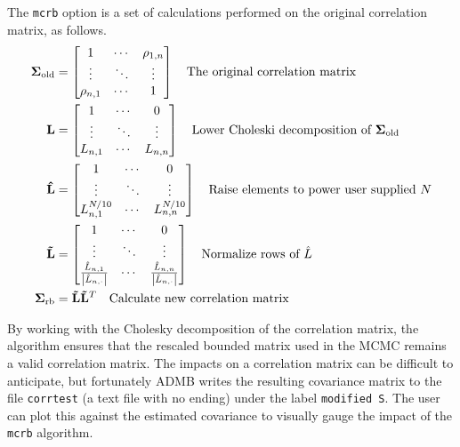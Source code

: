 \documentclass{article}\usepackage[]{graphicx}\usepackage[]{color}
\begin{document}
The \texttt{mcrb} option is a set of calculations performed
on the original correlation matrix, as follows.
\begin{align*}
  \mathbf{\Sigma_{\text{old}}}&=
  \begin{bmatrix}
    1 & \cdots & \rho_{1,n}\\
    \vdots & \ddots & \vdots\\
    \rho_{n,1} & \cdots & 1
  \end{bmatrix}
  \quad\text{The original correlation matrix}\\
  \mathbf{L}&=\begin{bmatrix}
    1 & \cdots & 0\\
    \vdots & \ddots & \vdots\\
    L_{n,1} & \cdots & L_{n,n}
  \end{bmatrix}
  \quad\text{Lower Choleski decomposition of $ \mathbf{\Sigma_{\text{old}}}$}\\
  \mathbf{\hat{L}}&=\begin{bmatrix}
    1 & \cdots & 0\\
    \vdots & \ddots & \vdots\\
    L_{n,1}^{N/10} & \cdots & L_{n,n}^{N/10}
  \end{bmatrix}
  \quad\text{Raise elements to power user supplied $N$}\\
  \mathbf{\tilde{L}}&=\begin{bmatrix}
    1 & \cdots & 0\\
    \vdots & \ddots & \vdots\\
    \frac{\hat{L}_{n,1}}{\left | \hat{L}_{n,\cdot}\right |} & \cdots &
    \frac{\hat{L}_{n,n}}{\left | \hat{L}_{n,\cdot}\right |}
  \end{bmatrix}
  \quad\text{Normalize rows of $\hat{L}$ }\\
  \mathbf{\Sigma_{\text{rb}}}&=\mathbf{\tilde{L}}\mathbf{\tilde{L}}^T
  \quad\text{Calculate new correlation matrix}
\end{align*}

By working with the Cholesky decomposition of the
correlation matrix, the algorithm ensures that the rescaled
bounded matrix used in the MCMC remains a valid correlation
matrix. The impacts on a correlation matrix can be difficult
to anticipate, but fortunately ADMB writes the resulting
covariance matrix to the file \texttt{corrtest} (a text file
with no ending) under the label \texttt{modified S}. The
user can plot this against the estimated covariance to
visually gauge the impact of the \texttt{mcrb} algorithm.
\end{document}
